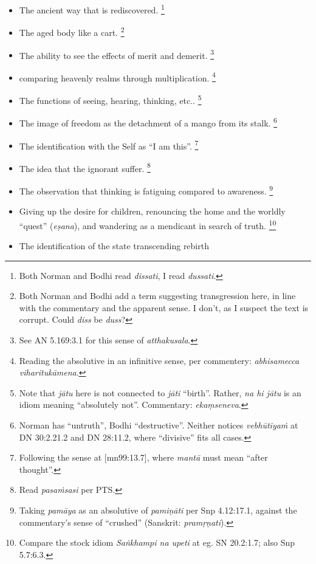\documentclass[12pt,openany]{book}%
\begin{document}
\begin{itemize}%
\item The ancient way that is rediscovered. \footnote{Both Norman and Bodhi read \textit{dissati}, I read \textit{dussati}. }%
\item The aged body like a cart. \footnote{Both Norman and Bodhi add a term suggesting transgression here, in line with the commentary and the apparent sense. I don’t, as I suspect the text is corrupt. Could \textit{diss} be \textit{duss}? }%
\item The ability to see the effects of merit and demerit. \footnote{See AN 5.169:3.1 for this sense of \textit{atthakusala}. }%
\item comparing heavenly realms through multiplication. \footnote{Reading the absolutive in an infinitive sense, per commentery: \textit{abhisamecca \textsanskrit{viharitukāmena}}. }%
\item The functions of seeing, hearing, thinking, etc.. \footnote{Note that \textit{\textsanskrit{jātu}} here is not connected to \textit{\textsanskrit{jāti}} “birth”. Rather, \textit{na hi \textsanskrit{jātu}} is an idiom meaning “absolutely not”. Commentary: \textit{ekaṃseneva}. }%
\item The image of freedom as the detachment of a mango from its stalk. \footnote{Norman has “untruth”, Bodhi “destructive”. Neither notices \textit{\textsanskrit{vebhūtiyaṁ}} at  DN 30:2.21.2 and DN 28:11.2, where “divisive” fits all cases. }%
\item The identification with the Self as “I am this”. \footnote{Following the sense at [mn99:13.7], where \textit{\textsanskrit{mantā}} must mean “after thought”. }%
\item The idea that the ignorant suffer. \footnote{Read \textit{\textsanskrit{pasaṁsasi}} per PTS. }%
\item The observation that thinking is fatiguing compared to awareness. \footnote{Taking \textit{\textsanskrit{pamāya}} as an absolutive of \textit{\textsanskrit{pamiṇāti}} per Snp 4.12:17.1, against the commentary’s sense of “crushed” (Sanskrit: \textit{\textsanskrit{pramṛṇati}}). }%
\item Giving up the desire for children, renouncing the home and the worldly “quest” (\textit{\textsanskrit{eṣana}}), and wandering as a mendicant in search of truth. \footnote{Compare the stock idiom \textit{\textsanskrit{Saṅkhampi} na upeti} at eg. SN 20.2:1.7; also Snp 5.7:6.3. }%
\item The identification of the state transcending rebirth

\end{itemize}
\end{document}
